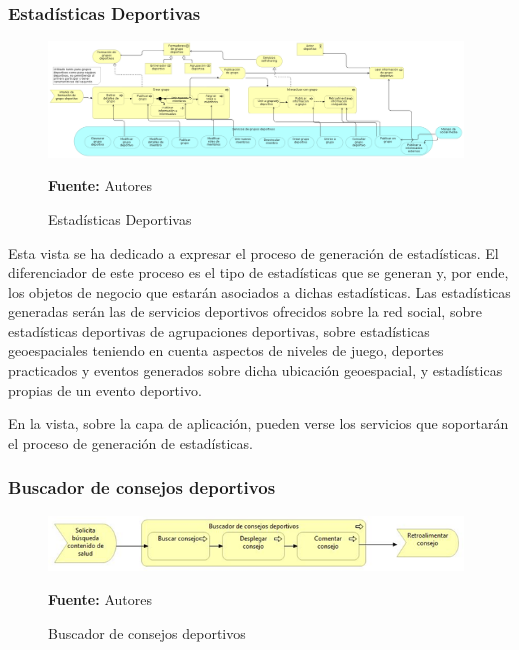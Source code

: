 \subsubsection{Estadísticas Deportivas}

\begin{figure}[!htb]
  \begin{center}
    \includegraphics[width=11cm]{./imagenes/Archimate/vistas/business_process/estadisticasdeportivas.png}
    \caption{Estadísticas Deportivas}
    \label{fig:bp_estadisticas_deportivo}
    \textbf{Fuente:}  Autores
  \end{center}
\end{figure}

Esta vista se ha dedicado a expresar el proceso de generación de estadísticas. El diferenciador de este proceso es el tipo de estadísticas que se generan y, por ende, los objetos de negocio que estarán asociados a dichas estadísticas. Las estadísticas generadas serán las de servicios deportivos ofrecidos sobre la red social, sobre estadísticas deportivas de agrupaciones deportivas, sobre estadísticas geoespaciales teniendo en cuenta aspectos de niveles de juego, deportes practicados y eventos generados sobre dicha ubicación geoespacial, y estadísticas propias de un evento deportivo.

En la vista, sobre la capa de aplicación, pueden verse los servicios que soportarán el proceso de generación de estadísticas.

\subsubsection{Buscador de consejos deportivos}

\begin{figure}[!htb]
  \begin{center}
    \includegraphics[width=11cm]{./imagenes/Archimate/vistas/business_process/buscadorconsejosdeportivos.png}
    \caption{Buscador de consejos deportivos}
    \label{fig:BP_BuscadorConsejosDeportivos}
    \textbf{Fuente:}  Autores
  \end{center}
\end{figure}


